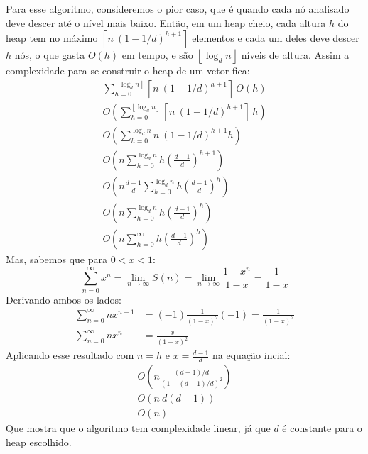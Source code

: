 Para esse algoritmo, consideremos o pior caso, que é quando cada nó analisado deve
descer até o nível mais baixo. Então, em um heap cheio, cada altura $h$ do heap tem no máximo
$\left\lceil n\ (1 - 1/d)^{h+1}\right\rceil$ elementos e cada um deles deve descer $h$ nós,
o que gasta $O(h)$ em tempo, e são $\left\lfloor\log_d n\right\rfloor$ níveis de altura. Assim a complexidade
para se construir o heap de um vetor fica:
\begin{gather*}
    \sum_{h = 0}^{\left\lfloor\log_d n\right\rfloor} \left\lceil n\ (1 - 1/d)^{h+1}\right\rceil\ O(h) \\
    O\left( \sum_{h = 0}^{\left\lfloor\log_d n\right\rfloor} \left\lceil n\ (1 - 1/d)^{h+1}\right\rceil\ h\right) \\
    O\left(\sum_{h = 0}^{\log_d n} n\ (1 - 1/d)^{h+1} h\right) \\
    O\left(n \sum_{h = 0}^{\log_d n} h \left(\frac{d - 1}{d}\right)^{h+1}\right) \\
    O\left(n \frac{d-1}{d} \sum_{h = 0}^{\log_d n} h \left(\frac{d - 1}{d}\right)^h\right) \\
    O\left(n \sum_{h = 0}^{\log_d n} h \left(\frac{d - 1}{d}\right)^h\right) \\
    O\left(n \sum_{h = 0}^{\infty} h \left(\frac{d - 1}{d}\right)^h\right)
\end{gather*}
Mas, sabemos que para $0 < x < 1$:
$$\sum_{n = 0}^\infty x^n = \lim_{n\to\infty} S(n) =  \lim_{n\to\infty} \frac{1-x^n}{1-x} = \frac{1}{1-x}$$
Derivando ambos os lados:
\begin{align*}
    \sum_{n = 0}^\infty n x^{n-1} &= (-1) \frac{1}{(1-x)^2} (-1) = \frac{1}{(1-x)^2} \\
    \sum_{n = 0}^\infty n x^n &= \frac{x}{(1-x)^2}
\end{align*}
Aplicando esse resultado com $n = h$ e $x = \frac{d-1}{d}$ na equação incial:
\begin{gather*}
    O\left(n \frac{(d-1)/d}{(1 - (d-1)/d)^2}\right) \\
    O\left(n\ d(d-1)\right) \\
    O(n)
\end{gather*}
Que mostra que o algoritmo tem complexidade linear, já que $d$ é constante para o heap escolhido.